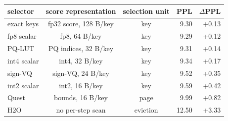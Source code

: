 \begin{tabular}{l c c r r}
\toprule
selector & score representation & selection unit & PPL & $\Delta$PPL \\
\midrule
exact keys & fp32 score, 128 B/key & key & 9.30 & +0.13 \\
fp8 scalar & fp8, 64 B/key & key & 9.29 & +0.12 \\
PQ-LUT & PQ indices, 32 B/key & key & 9.31 & +0.14 \\
int4 scalar & int4, 32 B/key & key & 9.34 & +0.17 \\
sign-VQ & sign-VQ, 24 B/key & key & 9.52 & +0.35 \\
int2 scalar & int2, 16 B/key & key & 9.59 & +0.42 \\
Quest & bounds, 16 B/key & page & 9.99 & +0.82 \\
H2O & no per-step scan & eviction & 12.50 & +3.33 \\
\bottomrule
\end{tabular}
